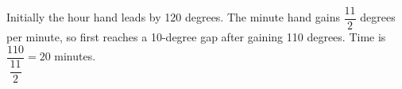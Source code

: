 Initially the hour hand leads by 120 degrees. The minute hand gains $\dfrac{11}{2}$ degrees per minute, so first reaches a 10-degree gap after gaining 110 degrees. Time is $\dfrac{110}{\dfrac{11}{2}}=\boxed{20}$ minutes.
